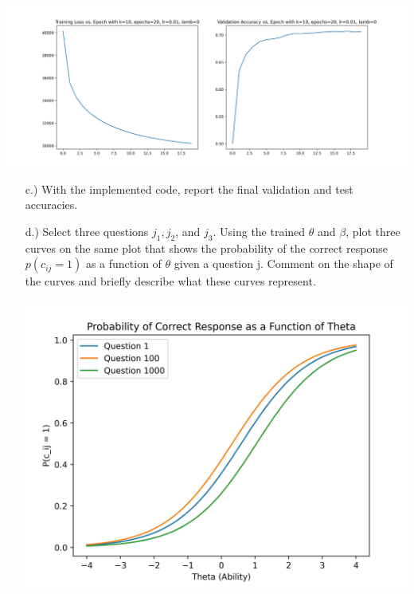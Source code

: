 	\begin{center}
			\includegraphics[scale=0.5]{../out/irt.jpg}
	\end{center}
	\begin{enumerate}
	\item [c.)] With the implemented code, report the final validation and test accuracies.
	\item [d.)]Select three questions $j_1, j_2$, and $j_3$. Using the trained $\theta$ and $\beta$, plot three curves on the same plot that shows the probability of the correct response $p(c_{ij} = 1)$ as a function of $\theta$ given a question j. Comment on the shape of the curves  and briefly describe what these curves represent.
	\begin{center}
		\includegraphics[scale=1]{../out/irt_d.jpg}
	\end{center}
\end{enumerate}